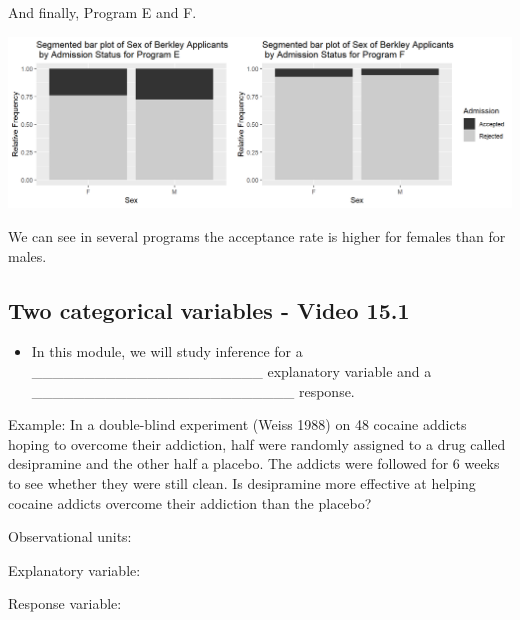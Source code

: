 \documentclass[
]{report}
\providecommand{\tightlist}{%
  \setlength{\itemsep}{0pt}\setlength{\parskip}{0pt}}
\begin{document}
And finally, Program E and F.

\begin{center}\includegraphics[width=0.85\linewidth]{images/SimPara_EF} \end{center}

We can see in several programs the acceptance rate is higher for females than for males.

\vspace{1in}

\newpage

\subsection*{Two categorical variables - Video 15.1}\label{two-categorical-variables---video-15.1}


\begin{itemize}
\tightlist
\item
  In this module, we will study inference for a \_\_\_\_\_\_\_\_\_\_\_\_\_\_\_\_\_\_\_\_\_\_ explanatory variable and a \_\_\_\_\_\_\_\_\_\_\_\_\_\_\_\_\_\_\_\_\_\_\_\_\_ response.
\end{itemize}


Example: In a double-blind experiment (Weiss 1988) on 48 cocaine addicts hoping to overcome their addiction, half were randomly assigned to a drug called desipramine and the other half a placebo. The addicts were followed for 6 weeks to see whether they were still clean. Is desipramine more effective at helping cocaine addicts overcome their addiction than the placebo?

Observational units:

\vspace{0.15in}

Explanatory variable:

\vspace{0.15in}

Response variable:
\end{document}
